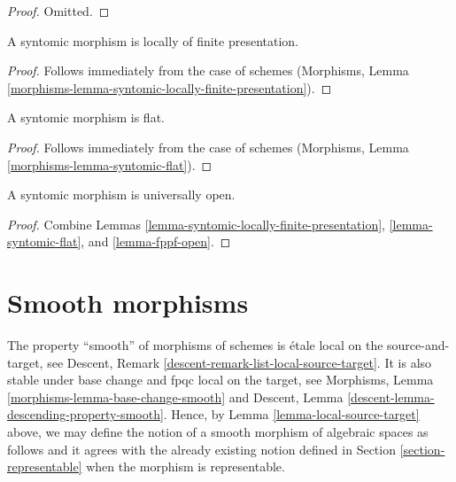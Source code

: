 \begin{proof}
Omitted.
\end{proof}

\begin{lemma}
\label{lemma-syntomic-locally-finite-presentation}
A syntomic morphism is locally of finite presentation.
\end{lemma}

\begin{proof}
Follows immediately from the case of schemes
(Morphisms, Lemma \ref{morphisms-lemma-syntomic-locally-finite-presentation}).
\end{proof}

\begin{lemma}
\label{lemma-syntomic-flat}
A syntomic morphism is flat.
\end{lemma}

\begin{proof}
Follows immediately from the case of schemes
(Morphisms, Lemma \ref{morphisms-lemma-syntomic-flat}).
\end{proof}

\begin{lemma}
\label{lemma-syntomic-open}
A syntomic morphism is universally open.
\end{lemma}

\begin{proof}
Combine
Lemmas \ref{lemma-syntomic-locally-finite-presentation},
\ref{lemma-syntomic-flat}, and
\ref{lemma-fppf-open}.
\end{proof}





\section{Smooth morphisms}
\label{section-smooth}

\noindent
The property ``smooth'' of morphisms of schemes is
\'etale local on the source-and-target, see
Descent, Remark \ref{descent-remark-list-local-source-target}.
It is also stable under base change and fpqc local on the target, see
Morphisms, Lemma \ref{morphisms-lemma-base-change-smooth}
and
Descent, Lemma \ref{descent-lemma-descending-property-smooth}.
Hence, by
Lemma \ref{lemma-local-source-target}
above, we may define the notion of a smooth morphism of algebraic spaces as
follows and it agrees with the already existing notion defined in
Section \ref{section-representable}
when the morphism is representable.

